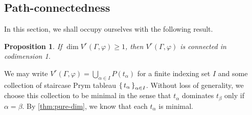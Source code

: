 \documentclass[11pt,reqno]{amsart}
\makeatletter
\newcommand*{\Z}{\mathbb{Z}}
\let\@@pmod\pmod
\DeclareRobustCommand{\pmod}{\@ifstar\@pmods\@@pmod}
\def\@pmods#1{\mkern4mu({\operator@font mod}\mkern 6mu#1)}
\newcommand{\yoav}[1]{{\color{blue} \sf  Yo$\alpha$v: [#1]}}
\theoremstyle{definition}
\theoremstyle{problem}
\theoremstyle{plain}
\newtheorem{proposition}[definition]{Proposition}
\newtheorem{lemma}[definition]{Lemma}
\newtheorem{corollary}[definition]{Corollary}
\theoremstyle{remark}
\theoremstyle{theorem}
\numberwithin{equation}{section}
\numberwithin{figure}{section}
\theoremstyle{definition}
\theoremstyle{problem}
\theoremstyle{plain}
\makeatother
\begin{document}
%
%
%
%
%
  
\subsection{Path-connectedness}
In this section, we shall occupy ourselves with the following result.

\begin{proposition}\label{thm:path}
  If $\dim V^r(\Gamma,\varphi) \geq 1$, then $V^r(\Gamma,\varphi)$ is
  connected in codimension 1.  
\end{proposition}

We may write
$V^r(\Gamma,\varphi) = \bigcup_{\alpha \in I} P(t_\alpha)$ for a
finite indexing set $I$ and some collection of staircase Prym tableau
$\set{t_\alpha}_{\alpha \in I}$.  Without loss of generality, we
choose this collection to be minimal in the sense that $t_{\alpha}$
dominates $t_{\beta}$ only if $\alpha = \beta$.  By
\cref{thm:pure-dim}, we know that each $t_{\alpha}$ is minimal.
\end{document}
